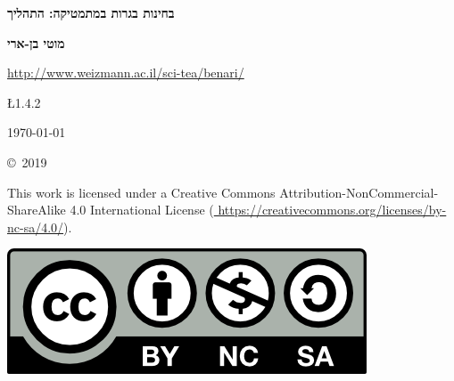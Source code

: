 

\thispagestyle{empty}

\begin{center}
\textbf{\LARGE בחינות בגרות במתמטיקה: התהליך}
\end{center}

\bigskip
\bigskip

\begin{center}
\textbf{\Large מוטי בן-ארי}

\bigskip

\url{http://www.weizmann.ac.il/sci-tea/benari/}
\end{center}

\begin{center}	
\begin{bfseries}
\bigskip
\bigskip

 \L{1.4.2} 

\bigskip

\today

\end{bfseries}
\end{center}

\vfill


\begin{small}
\begin{center}
\copyright{}\ 2019 
\end{center}
This work is licensed under a Creative Commons Attribution-NonCommercial-ShareAlike 4.0 International License (\url{
https://creativecommons.org/licenses/by-nc-sa/4.0/}).
\end{small}

\bigskip

\begin{center}
\includegraphics[width=.3\textwidth]{../../by-nc-sa.png}
\end{center}

\np

\thispagestyle{empty}

\mbox{}

\np

\thispagestyle{empty}

\tableofcontents

